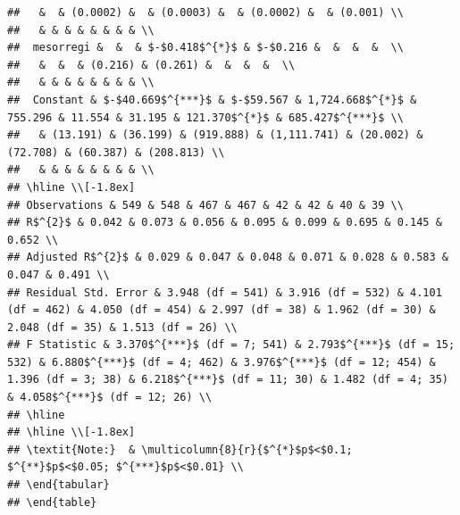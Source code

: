 \documentclass[
  a4paper,
]{article}
\begin{document}
\begin{verbatim}
##   &  & (0.0002) &  & (0.0003) &  & (0.0002) &  & (0.001) \\ 
##   & & & & & & & & \\ 
##  mesorregi &  &  & $-$0.418$^{*}$ & $-$0.216 &  &  &  &  \\ 
##   &  &  & (0.216) & (0.261) &  &  &  &  \\ 
##   & & & & & & & & \\ 
##  Constant & $-$40.669$^{***}$ & $-$59.567 & 1,724.668$^{*}$ & 755.296 & 11.554 & 31.195 & 121.370$^{*}$ & 685.427$^{***}$ \\ 
##   & (13.191) & (36.199) & (919.888) & (1,111.741) & (20.002) & (72.708) & (60.387) & (208.813) \\ 
##   & & & & & & & & \\ 
## \hline \\[-1.8ex] 
## Observations & 549 & 548 & 467 & 467 & 42 & 42 & 40 & 39 \\ 
## R$^{2}$ & 0.042 & 0.073 & 0.056 & 0.095 & 0.099 & 0.695 & 0.145 & 0.652 \\ 
## Adjusted R$^{2}$ & 0.029 & 0.047 & 0.048 & 0.071 & 0.028 & 0.583 & 0.047 & 0.491 \\ 
## Residual Std. Error & 3.948 (df = 541) & 3.916 (df = 532) & 4.101 (df = 462) & 4.050 (df = 454) & 2.997 (df = 38) & 1.962 (df = 30) & 2.048 (df = 35) & 1.513 (df = 26) \\ 
## F Statistic & 3.370$^{***}$ (df = 7; 541) & 2.793$^{***}$ (df = 15; 532) & 6.880$^{***}$ (df = 4; 462) & 3.976$^{***}$ (df = 12; 454) & 1.396 (df = 3; 38) & 6.218$^{***}$ (df = 11; 30) & 1.482 (df = 4; 35) & 4.058$^{***}$ (df = 12; 26) \\ 
## \hline 
## \hline \\[-1.8ex] 
## \textit{Note:}  & \multicolumn{8}{r}{$^{*}$p$<$0.1; $^{**}$p$<$0.05; $^{***}$p$<$0.01} \\ 
## \end{tabular} 
## \end{table}
\end{verbatim}
\end{document}
